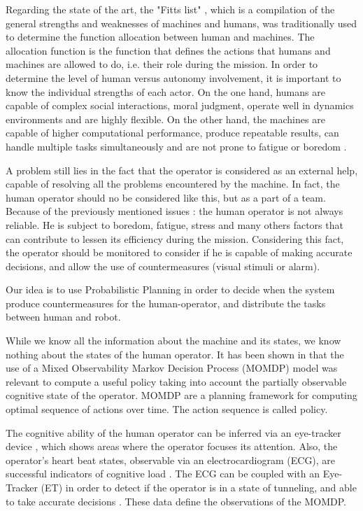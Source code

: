 \documentclass[conference]{IEEEtran}
\begin{document}
Regarding the state of the art, the "Fitts list" \cite{FITTS}, 
which is a compilation of the general strengths and weaknesses of machines and humans, 
was traditionally used to determine the function allocation between human and machines. 
The allocation function is the function that defines the actions that humans and machines are allowed to do, i.e. their role during the mission. 
In order to determine the level of human versus autonomy involvement, it is important to know the individual strengths of each actor. On the one hand, humans are capable of complex social interactions, moral judgment, operate well in dynamics environments and are highly flexible. On the other hand, the machines are capable of higher computational performance, produce repeatable results, can handle multiple tasks simultaneously and are not prone to fatigue or boredom \cite{NOTHWANG}.

A problem still lies in the fact that the operator is considered as an external help, 
capable of resolving all the problems encountered by the machine. 
In fact, the human operator should no be considered like this, but as a part of a team.
Because of the previously mentioned issues : the human operator is not always reliable. He is subject to boredom, fatigue, stress and many others factors that can contribute to lessen its efficiency during the mission.
Considering this fact, the operator should be monitored to consider if he is capable of making accurate decisions, and allow the use of countermeasures (visual stimuli or alarm). 

Our idea is to use Probabilistic Planning in order to decide when the system produce countermeasures for the human-operator, and distribute the tasks between human and robot.

While we know all the information about the machine and its states, we know nothing about the states of the human operator. 
It has been shown in \cite{SOUZA} that the use of a Mixed Observability Markov Decision Process (MOMDP)
 model \cite{ONG} was relevant to compute a useful policy taking into account the partially observable cognitive state of the operator.
MOMDP are a planning framework for computing optimal sequence of actions over time. The action sequence is called policy.

The cognitive ability of the human operator can be inferred via an eye-tracker device \cite{GATEAU}, 
which shows areas where the operator focuses its attention. Also, the operator's heart beat states, observable via an electrocardiogram (ECG), 
are successful indicators of cognitive load \cite{WILSON}. 
The ECG can be coupled with an Eye-Tracker (ET) in order to detect if the operator is in a state of tunneling, and able to take accurate decisions \cite{rachelson2011optimal}. %
These data define the observations of the MOMDP.
\end{document}

